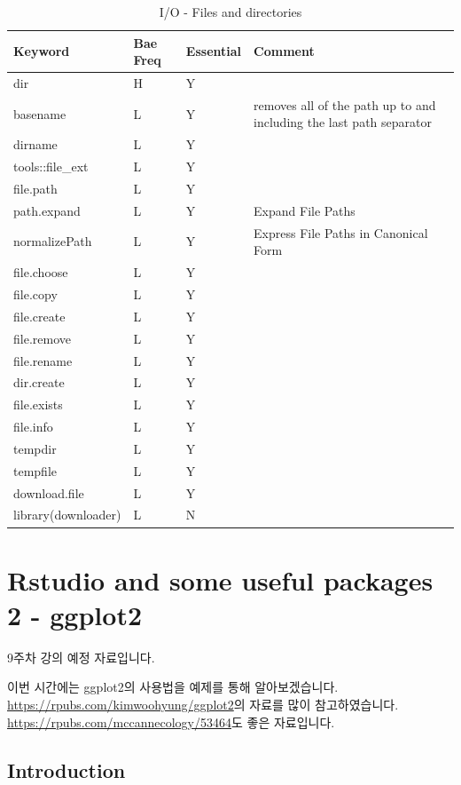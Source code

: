 \documentclass[10pt,]{krantz}
\renewenvironment{quote}{\begin{VF}}{\end{VF}}
\theoremstyle{definition}
\theoremstyle{definition}
\theoremstyle{remark}
\begin{document}
\begin{table}

\caption{\label{tab:knitchunk26}I/O - Files and directories }
\centering
\begin{tabular}[t]{llll}
\toprule
Keyword & Bae Freq & Essential & Comment\\
\midrule
dir & H & Y & \\
basename & L & Y & removes all of the path up to and including the last path separator\\
dirname & L & Y & \\
tools::file\_ext & L & Y & \\
file.path & L & Y & \\
\addlinespace
path.expand & L & Y & Expand File Paths\\
normalizePath & L & Y & Express File Paths in Canonical Form\\
file.choose & L & Y & \\
file.copy & L & Y & \\
file.create & L & Y & \\
\addlinespace
file.remove & L & Y & \\
file.rename & L & Y & \\
dir.create & L & Y & \\
file.exists & L & Y & \\
file.info & L & Y & \\
\addlinespace
tempdir & L & Y & \\
tempfile & L & Y & \\
download.file & L & Y & \\
library(downloader) & L & N & \\
\bottomrule
\end{tabular}
\end{table}

\chapter{Rstudio and some useful packages 2 - ggplot2}\label{ggplot2}

\begin{quote}
9주차 강의 예정 자료입니다.
\end{quote}

이번 시간에는 ggplot2의 사용법을 예제를 통해 알아보겠습니다.
\citep{R-ggplot2} \url{https://rpubs.com/kimwoohyung/ggplot2}의 자료를
많이 참고하였습니다. \url{https://rpubs.com/mccannecology/53464}도 좋은
자료입니다.

\section{Introduction}\label{introduction-1}
\end{document}
